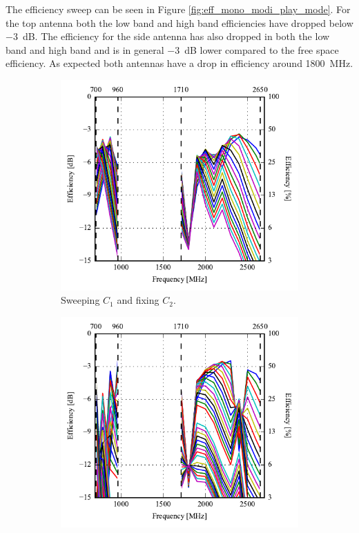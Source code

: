 The efficiency sweep can be seen in Figure \ref{fig:eff_mono_modi_play_mode}. For the top antenna both the low band and high band efficiencies have dropped below \SI{-3}{dB}. The efficiency for the side antenna has also dropped in both the low band and high band and is in general \SI{-3}{dB} lower compared to the free space efficiency. As expected both antennas have a drop in efficiency around \SI{1800}{MHz}. 
\begin{figure}[htbp]
    \centering
    \begin{subfigure}{0.49\linewidth}
        \includegraphics{img/tech_sol/monopole/highband/ue/playmode/eff_top.pdf}
        \caption{Sweeping $C_1$ and fixing $C_2$.}
    \end{subfigure}
    \hfill
    \begin{subfigure}{0.49\linewidth}
        \includegraphics{img/tech_sol/monopole/highband/ue/playmode/eff_side.pdf}

\end{subfigure}
\end{figure}
